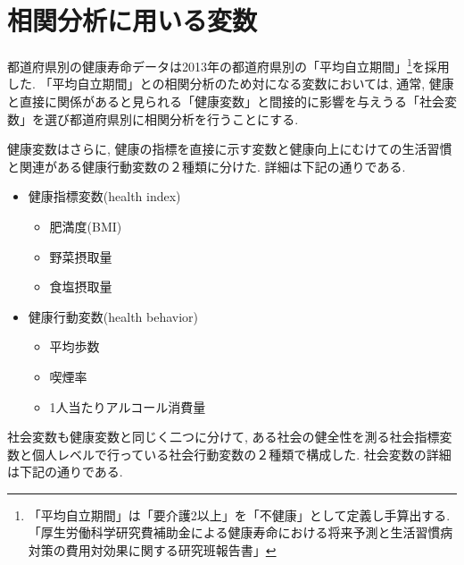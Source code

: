\section{相関分析に用いる変数}
都道府県別の健康寿命データは2013年の都道府県別の「平均自立期間」\footnote{「平均自立期間」は「要介護2以上」を「不健康」として定義し手算出する. 「厚生労働科学研究費補助金による健康寿命における将来予測と生活習慣病対策の費用対効果に関する研究班報告書」}を採用した. 「平均自立期間」との相関分析のため対になる変数においては, 通常, 健康と直接に関係があると見られる「健康変数」と間接的に影響を与えうる「社会変数」を選び都道府県別に相関分析を行うことにする.

健康変数はさらに, 健康の指標を直接に示す変数と健康向上にむけての生活習慣と関連がある健康行動変数の２種類に分けた. 詳細は下記の通りである.
\begin{itemize} \setlength{\itemsep}{-0.5mm} \setlength{\parskip}{-0.5mm}
	\item 健康指標変数(health index)
	      \begin{itemize} \setlength{\itemsep}{-0.5mm} \setlength{\parskip}{-0.5mm}
		      \item 	肥満度(BMI)
		      \item 	野菜摂取量
		      \item 	食塩摂取量
	      \end{itemize}

	\item 健康行動変数(health behavior)
	      \begin{itemize} \setlength{\itemsep}{-0.5mm} \setlength{\parskip}{-0.5mm}
		      \item 	平均歩数
		      \item 	喫煙率
		      \item 	1人当たりアルコール消費量
	      \end{itemize}
\end{itemize}

社会変数も健康変数と同じく二つに分けて, ある社会の健全性を測る社会指標変数と個人レベルで行っている社会行動変数の２種類で構成した. 社会変数の詳細は下記の通りである.

